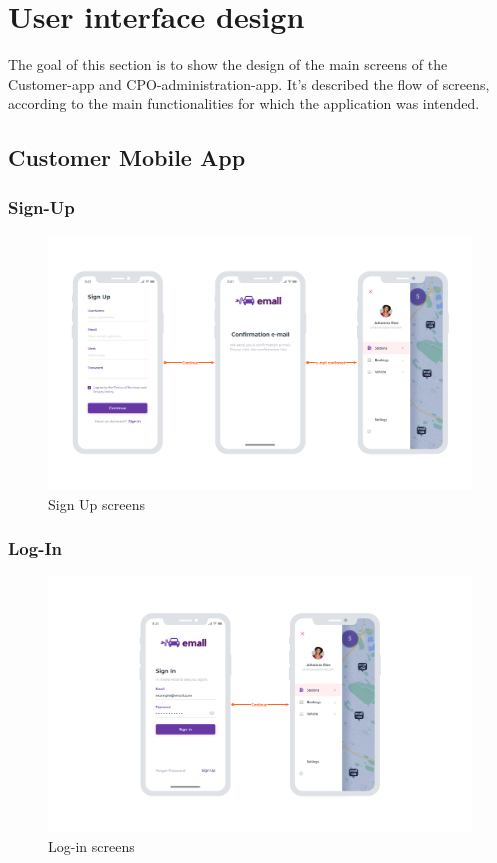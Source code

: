 \section{User interface design}
The goal of this section is to show the design of the main screens of the Customer-app and CPO-administration-app. 
It's described the flow of screens, according to the main functionalities for which the application was intended.

\subsection{Customer Mobile App}

\subsubsection{Sign-Up}
\begin{center}
    \begin{figure}[H]
        \includegraphics[width=\textwidth]{./img/design/app/Signup.png}
        \caption{Sign Up screens}
    \end{figure}
\end{center}

\subsubsection{Log-In}
\begin{center}
    \begin{figure}[H]
        \includegraphics[width=\textwidth]{./img/design/app/Login.png}
        \caption{Log-in screens}
    \end{figure}
\end{center}


